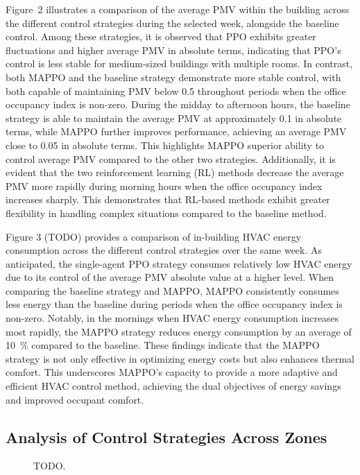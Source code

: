 \documentclass[preprint,12pt]{elsarticle}
\newcommand{\figurestorepath}{../packages/hvacmarl6e43_notebooks/__datastore__}
\begin{document}
Figure~2 illustrates a comparison of the average PMV within the building across the different control strategies during the selected week, alongside the baseline control. 
Among these strategies, it is observed that PPO exhibits greater fluctuations and higher average PMV in absolute terms, indicating that PPO's control is less stable for medium-sized buildings with multiple rooms. 
In contrast, both MAPPO and the baseline strategy demonstrate more stable control, with both capable of maintaining PMV below 0.5 throughout periods when the office occupancy index is non-zero. 
During the midday to afternoon hours, the baseline strategy is able to maintain the average PMV at approximately 0.1 in absolute terms, while MAPPO further improves performance, achieving an average PMV close to 0.05 in absolute terms. 
This highlights MAPPO superior ability to control average PMV compared to the other two strategies. 
Additionally, it is evident that the two reinforcement learning (RL) methods decrease the average PMV more rapidly during morning hours when the office occupancy index increases sharply. 
This demonstrates that RL-based methods exhibit greater flexibility in handling complex situations compared to the baseline method.

Figure 3 (TODO) provides a comparison of in-building HVAC energy consumption across the different control strategies over the same week. 
As anticipated, the single-agent PPO strategy consumes relatively low HVAC energy due to its control of the average PMV absolute value at a higher level. 
When comparing the baseline strategy and MAPPO, MAPPO consistently consumes less energy than the baseline during periods when the office occupancy index is non-zero. 
Notably, in the mornings when HVAC energy consumption increases most rapidly, the MAPPO strategy reduces energy consumption by an average of \SI{10}{\percent} compared to the baseline. 
These findings indicate that the MAPPO strategy is not only effective in optimizing energy costs but also enhances thermal comfort. 
This underscores MAPPO's capacity to provide a more adaptive and efficient HVAC control method, achieving the dual objectives of energy savings and improved occupant comfort.

\subsection{Analysis of Control Strategies Across Zones}

\begin{figure}[H]
    \label{figure:time-v-pmv-abs}
    \centering
    \caption{TODO.}
\end{figure}
\end{document}
